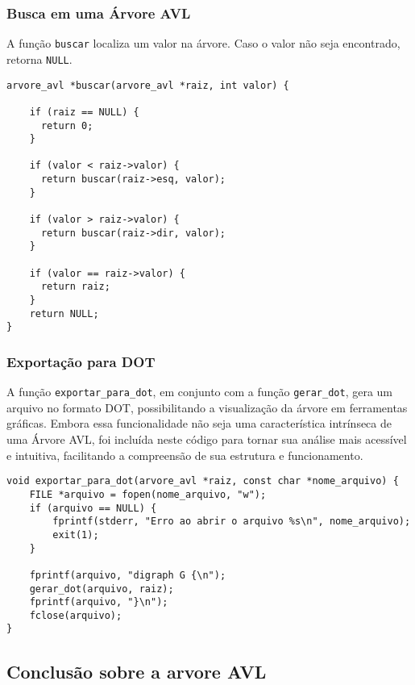 \vspace{3mm}

\subsubsection{Busca em uma Árvore AVL}

\vspace{3mm}

A função \texttt{buscar} localiza um valor na árvore. Caso o valor não seja encontrado, retorna \texttt{NULL}.

\begin{lstlisting}
arvore_avl *buscar(arvore_avl *raiz, int valor) {

    if (raiz == NULL) {
      return 0;
    }
  
    if (valor < raiz->valor) {
      return buscar(raiz->esq, valor);
    }
  
    if (valor > raiz->valor) {
      return buscar(raiz->dir, valor);
    }
  
    if (valor == raiz->valor) {
      return raiz;
    }
    return NULL;
}
\end{lstlisting}

\subsubsection{Exportação para DOT}

A função \texttt{exportar\_para\_dot}, em conjunto com a função \texttt{gerar\_dot}, gera um arquivo no formato DOT, possibilitando a visualização da árvore em ferramentas gráficas.
Embora essa funcionalidade não seja uma característica intrínseca de uma Árvore AVL,
foi incluída neste código para tornar sua análise mais acessível e intuitiva, facilitando a compreensão de sua estrutura e funcionamento.

\begin{lstlisting}
void exportar_para_dot(arvore_avl *raiz, const char *nome_arquivo) {
    FILE *arquivo = fopen(nome_arquivo, "w");
    if (arquivo == NULL) {
        fprintf(stderr, "Erro ao abrir o arquivo %s\n", nome_arquivo);
        exit(1);
    }

    fprintf(arquivo, "digraph G {\n");
    gerar_dot(arquivo, raiz);
    fprintf(arquivo, "}\n");
    fclose(arquivo);
}
\end{lstlisting}

\vspace{3mm}

\subsection{Conclusão sobre a arvore AVL}

